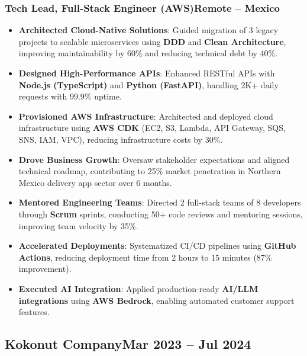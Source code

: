 \documentclass[a4paper,10pt]{article}
\newcommand{\kw}[1]{\textbf{\textcolor{keyword}{#1}}}
\newcommand{\tech}[1]{\textbf{\textcolor{tech}{#1}}}
\begin{document}
\subsubsection*{\small Tech Lead, Full-Stack Engineer (AWS)\hfill Remote -- Mexico}
\begin{itemize}[noitemsep, leftmargin=*]
    \item \textbf{Architected Cloud-Native Solutions}: Guided migration of 3 legacy projects to scalable microservices using \kw{DDD} and \kw{Clean Architecture}, improving maintainability by 60\% and reducing technical debt by 40\%.
    \item \textbf{Designed High-Performance APIs}: Enhanced RESTful APIs with \tech{Node.js (TypeScript)} and \tech{Python (FastAPI)}, handling 2K+ daily requests with 99.9\% uptime.
    \item \textbf{Provisioned AWS Infrastructure}: Architected and deployed cloud infrastructure using \tech{AWS CDK} (EC2, S3, Lambda, API Gateway, SQS, SNS, IAM, VPC), reducing infrastructure costs by 30\%.
    \item \textbf{Drove Business Growth}: Oversaw stakeholder expectations and aligned technical roadmap, contributing to 25\% market penetration in Northern Mexico delivery app sector over 6 months.
    \item \textbf{Mentored Engineering Teams}: Directed 2 full-stack teams of 8 developers through \kw{Scrum} sprints, conducting 50+ code reviews and mentoring sessions, improving team velocity by 35\%.
    \item \textbf{Accelerated Deployments}: Systematized CI/CD pipelines using \tech{GitHub Actions}, reducing deployment time from 2 hours to 15 minutes (87\% improvement).
    \item \textbf{Executed AI Integration}: Applied production-ready \kw{AI/LLM integrations} using \tech{AWS Bedrock}, enabling automated customer support features.
\end{itemize}

\subsection*{\small Kokonut Company\hfill\textbf{Mar 2023 -- Jul 2024}}
\end{document}
